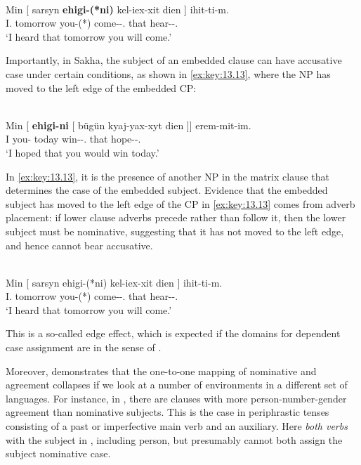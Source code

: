 \documentclass[output=paper]{langsci/langscibook}
\begin{document}
\ea%
    \label{ex:key:13.12} \parencite[113]{Baker2015}\\
    \gll  Min    [ sarsyn \textbf{ehigi-(*ni)}  kel-iex-xit dien ] ihit-ti-m.\\
          I.\Nom{} {} tomorrow you-(*\Acc)  come-\Fut{}-\Spl.\Sbj{}  that {} hear-\Pst{}-\Fsg.\Sbj{}\\
    \glt  ‘I heard that tomorrow you will come.’
\z

Importantly, in Sakha, the subject of an embedded clause can have accusative
case under certain conditions, as shown in \eqref{ex:key:13.13}, where the NP has
moved to the left edge of the embedded CP:

\ea%
    \label{ex:key:13.13} \parencite[114]{Baker2015}\\
    \gll  Min [ \textbf{ehigi-ni} [ bügün kyaj-yax-xyt dien ]]  erem-mit-im.\\
    I {} you-\Acc{} {} today win-\Fut{}-\Tpl.\Sbj{}  that {} hope-\Ptcp{}-\Fsg.\Sbj{}\\
    \glt  ‘I hoped that you would win today.’
\z

In \eqref{ex:key:13.13}, it is the presence of another NP in the matrix clause that
determines the case of the embedded subject. Evidence that the embedded subject
has moved to the left edge of the CP in \eqref{ex:key:13.13} comes from adverb
placement: if lower clause adverbs precede rather than follow it, then the
lower subject must be nominative, suggesting that it has not moved to the left
edge, and hence cannot bear accusative.\newpage

\ea%
    \label{ex:key:13.14} \parencite[115]{Baker2015}\\
    \gll    Min [ sarsyn ehigi-(*ni)  kel-iex-xit dien ]  ihit-ti-m.\\
    I.\Nom{} {} tomorrow you-(*\Acc)  come-\Fut{}-\Spl.\Sbj{} that {} hear-\Pst{}-\Fsg.\Sbj{}\\
    \glt    ‘I heard that tomorrow you will come.’
\z

This is a so-called edge effect, which is expected if the domains for dependent
case assignment are  in the sense of \citet{Chomsky2001}.

Moreover, \citet{Baker2015} demonstrates that the one-to-one mapping of
nominative and agreement collapses if we look at a number of environments in a
different set of languages. For instance, in , there are clauses
with more person-number-gender agreement than nominative subjects. This is the
case in periphrastic tenses consisting of a past or imperfective main verb and
an auxiliary. Here \emph{both verbs}  with the subject in
, including person, but presumably cannot both assign the
subject nominative case.
\end{document}
